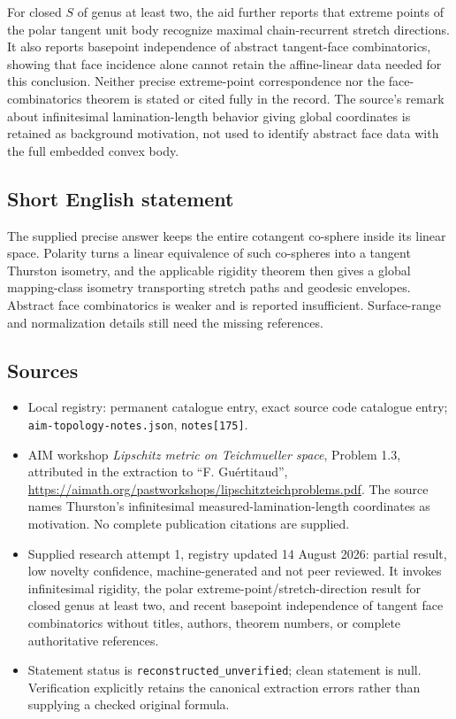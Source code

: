 \documentclass[11pt]{article}
\begin{document}
For closed $S$ of genus at least two, the aid further reports that extreme points of the polar tangent unit body recognize maximal chain-recurrent stretch directions. It also reports basepoint independence of abstract tangent-face combinatorics, showing that face incidence alone cannot retain the affine-linear data needed for this conclusion. Neither precise extreme-point correspondence nor the face-combinatorics theorem is stated or cited fully in the record. The source's remark about infinitesimal lamination-length behavior giving global coordinates is retained as background motivation, not used to identify abstract face data with the full embedded convex body.
\subsection{Short English statement}
The supplied precise answer keeps the entire cotangent co-sphere inside its linear space. Polarity turns a linear equivalence of such co-spheres into a tangent Thurston isometry, and the applicable rigidity theorem then gives a global mapping-class isometry transporting stretch paths and geodesic envelopes. Abstract face combinatorics is weaker and is reported insufficient. Surface-range and normalization details still need the missing references.
\subsection{Sources}
\begin{itemize}
\item Local registry: permanent catalogue entry, exact source code catalogue entry; \texttt{aim-topology-notes.json}, \texttt{notes[175]}.
\item AIM workshop \emph{Lipschitz metric on Teichmueller space}, Problem 1.3, attributed in the extraction to ``F. Gu\'ertitaud'', \url{https://aimath.org/pastworkshops/lipschitzteichproblems.pdf}. The source names Thurston's infinitesimal measured-lamination-length coordinates as motivation. No complete publication citations are supplied.
\item Supplied research attempt 1, registry updated 14 August 2026: partial result, low novelty confidence, machine-generated and not peer reviewed. It invokes infinitesimal rigidity, the polar extreme-point/stretch-direction result for closed genus at least two, and recent basepoint independence of tangent face combinatorics without titles, authors, theorem numbers, or complete authoritative references.
\item Statement status is \texttt{reconstructed\_unverified}; clean statement is null. Verification explicitly retains the canonical extraction errors rather than supplying a checked original formula.
\end{itemize}
\end{document}
